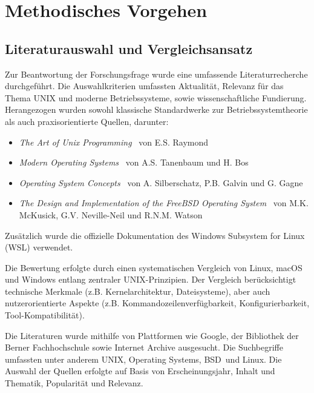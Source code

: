 \section{Methodisches Vorgehen}

\subsection{Literaturauswahl und Vergleichsansatz}

Zur Beantwortung der Forschungsfrage wurde eine umfassende Literaturrecherche durchgeführt. Die Auswahlkriterien umfassten Aktualität, Relevanz für das
Thema \glqq UNIX und moderne Betriebssysteme\grqq, sowie wissenschaftliche Fundierung. Herangezogen wurden sowohl klassische Standardwerke zur Betriebssystemtheorie
als auch praxisorientierte Quellen, darunter:

\begin{itemize}
	\setlength{\itemsep}{0pt}
	\item \textit{\glqq The Art of Unix Programming\grqq} \ von E.S. Raymond \cite{ArtOfUnixProgramming}
	\item \textit{\glqq Modern Operating Systems\grqq} \ von A.S. Tanenbaum und H. Bos \cite{ModernOS}
	\item \textit{\glqq Operating System Concepts\grqq} \ von A. Silberschatz, P.B. Galvin und G. Gagne \cite{OSConcept}
	\item \textit{\glqq The Design and Implementation of the FreeBSD Operating System\grqq} \ von M.K. McKusick, G.V. Neville-Neil und R.N.M. Watson \cite{FreeBSDOS}
\end{itemize}

Zusätzlich wurde die offizielle Dokumentation des Windows Subsystem for Linux (WSL) verwendet. \cite{WSL}

Die Bewertung erfolgte durch einen systematischen Vergleich von Linux, macOS und Windows entlang zentraler UNIX-Prinzipien. Der Vergleich berücksichtigt
technische Merkmale (z.B. Kernelarchitektur, Dateisysteme), aber auch nutzerorientierte Aspekte (z.B. Kommandozeilenverfügbarkeit, Konfigurierbarkeit,
Tool-Kompatibilität).

Die Literaturen wurde mithilfe von Plattformen wie Google, der Bibliothek der Berner Fachhochschule sowie Internet Archive ausgesucht. Die Suchbegriffe umfassten
unter anderem \glqq UNIX\grqq, \glqq Operating Systems\grqq, \glqq BSD\grqq \ und \glqq Linux\grqq. Die Auswahl der Quellen erfolgte auf Basis von Erscheinungsjahr,
Inhalt und Thematik, Popularität und Relevanz.

